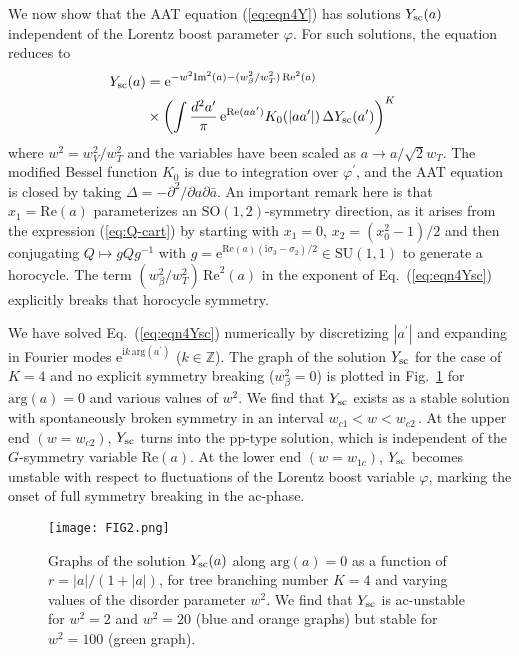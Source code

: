 \documentclass[aps,prl,twocolumn,letterpaper,superscriptaddress]{revtex4-2}
\begin{document}
We now show that the AAT equation (\ref{eq:eqn4Y}) has solutions $Y_{\rm sc}(a)$ independent of the Lorentz boost parameter $\varphi$. For such solutions, the equation reduces to
\begin{align}\label{eq:eqn4Ysc}
    Y_{\rm sc} (a) &= \mathrm{e}^{- w^2 \mathrm{Im}^2 (a) - (w_\beta^2 / w_T^2)\, \mathrm{Re}^2 (a)} \cr
    &\times \left( \int \frac{d^2 a^\prime}{\pi} \, \mathrm{e}^{\mathrm{Re}(a a^\prime)} K_0(|a a^\prime|)
    \, \Delta Y_{\rm sc} (a^\prime) \right)^{K}
\end{align}
where $w^2 = w_V^2 / w_T^2$ and the variables have been scaled as $a \to a / \sqrt{2} w_T$. The modified Bessel function $K_0$ is due to integration over $\varphi^\prime$, and the AAT equation is closed by taking $\Delta = - \partial^2 / \partial a \partial \bar{a}$. An important remark here is that $x_1 = \mathrm{Re}(a)$ parameterizes an $\mathrm{SO}(1,2)$-symmetry direction, as it arises from the expression (\ref{eq:Q-cart}) by starting with $x_1 = 0$, $x_2 = (x_0^2 - 1)/2$ and then conjugating $Q \mapsto g Q g^{-1}$ with $g = \mathrm{e}^{ \mathrm{Re}(a) (\mathrm{i}\sigma_3 - \sigma_2)/2} \in \mathrm{SU}(1,1)$ to generate a horocycle. The term $(w_\beta^2 / w_T^2) \, \mathrm{Re}^2 (a)$ in the exponent of Eq.\ (\ref{eq:eqn4Ysc}) explicitly breaks that horocycle symmetry.

We have solved Eq.\ (\ref{eq:eqn4Ysc}) numerically by discretizing $|a^\prime|$ and expanding in Fourier modes $\mathrm{e}^{\mathrm{i} k\, \mathrm{arg}(a^\prime)}$ ($k \in \mathbb{Z}$). The graph of the solution $Y_{\rm sc}$ for the case of $K = 4$ and no explicit symmetry breaking ($w_\beta^2 = 0$) is plotted in Fig.\ \ref{fig:F2} for  $\mathrm{arg}(a) = 0$ and various values of $w^2$. We find that $Y_{\rm sc}$ exists as a stable solution with spontaneously broken symmetry in an interval $w_{c1} < w < w_{c2}\,$. At the upper end $(w = w_{c2})$, $Y_{\rm sc}$ turns into the pp-type solution, which is independent of the $G$-symmetry variable $\mathrm{Re}(a)$. At the lower end $(w = w_{1c})$, $Y_{\rm sc}$ becomes unstable with respect to fluctuations of the Lorentz boost variable $\varphi$, marking the onset of full symmetry breaking in the ac-phase.
\begin{figure}
    \centering
    \texttt{[image: FIG2.png]}
    \caption{Graphs of the solution $Y_{\rm sc}(a)$ along $\mathrm{arg}(a) = 0$ as a function of  $r = |a|/(1+|a|)$, for tree branching number $K = 4$ and varying values of the disorder parameter $w^2$. We find that $Y_{\rm sc}$ is ac-unstable for $w^2 = 2$ and $w^2 = 20$ (blue and orange graphs) but stable for $w^2 = 100$ (green graph).} \label{fig:F2}
\end{figure}
\end{document}
